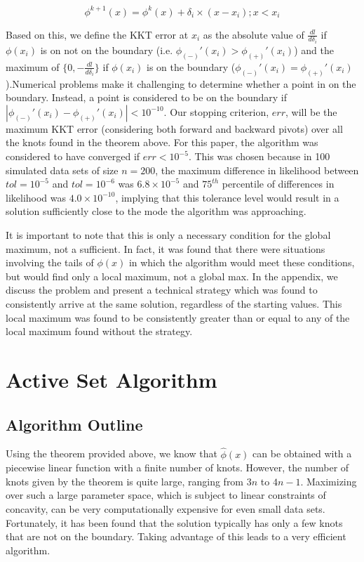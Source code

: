 \documentclass[10pt]{article}
\begin{document}
	\[ \phi^{k+1}(x) = \phi^{k}(x) + \delta_i \times (x - x_i) ; x < x_i
	\]



	Based on this, we define the KKT error at $x_i$ as the absolute value of $\frac {dl} {d\delta_i}$ if $\phi(x_i)$ is on not on the boundary (i.e. $\phi_{(-)}'(x_i) > \phi_{(+)}'(x_i)$) and the maximum of $\{0, -\frac {dl} {d\delta_i} \}$ if $\phi(x_i)$ is on the boundary ($\phi_{(-)}'(x_i) = \phi_{(+)}'(x_i)$).Numerical problems make it challenging to determine whether a point in on the boundary. Instead, a point is considered to be on the boundary if $| \phi_{(-)}'(x_i) - \phi_{(+)}'(x_i) | < 10^{-10}$. Our stopping criterion, $err$, will be the maximum KKT error (considering both forward and backward pivots) over all the knots found in the theorem above. For this paper, the algorithm was considered to have converged if $err < 10^{-5}$. This was chosen because in 100 simulated data sets of size $n = 200$, the maximum difference in likelihood between $tol = 10^{-5}$ and $tol = 10^{-6}$ was $6.8 \times 10^{-5}$ and $75^{th}$ percentile of differences in likelihood was $4.0 \times 10^{-10}$, implying that this tolerance level would result in a solution sufficiently close to the mode the algorithm was approaching. 
	
	It is important to note that this is only a necessary condition for the global maximum, not a sufficient. In fact, it was found that there were situations involving the tails of $\phi(x)$ in which the algorithm would meet these conditions, but would find only a local maximum, not a global max. In the appendix, we discuss the problem and present a technical strategy which was found to consistently arrive at the same solution, regardless of the starting values. This local maximum was found to be consistently greater than or equal to any of the local maximum found without the strategy. 
	
{\section{Active Set Algorithm} }
	
	{\subsection{Algorithm Outline} } 
	
	Using the theorem provided above, we know that $\hat\phi(x)$ can be obtained with a piecewise linear function with a finite number of knots. However, the number of knots given by the theorem is quite large, ranging from $3n$ to $4n - 1$. Maximizing over such a large parameter space, which is subject to linear constraints of concavity, can be very computationally expensive for even small data sets. Fortunately, it has been found that the solution typically has only a few knots that are not on the boundary. Taking advantage of this leads to a very efficient algorithm.
	
\end{document}
